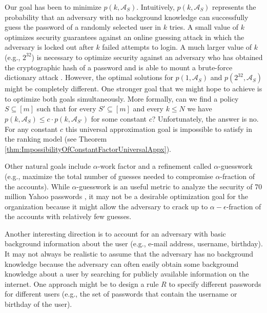 \documentclass[prodmode,acmec]{ec-acmsmall}
\begin{document}
\smallskip
{} Our goal \cite{boztas1999entropies} has been to minimize $p\left(k, \mathcal{A}_S \right)$. Intuitively, $p\left(k, \mathcal{A}_S \right)$ represents the probability that an adversary with no background knowledge can successfully guess the password of a randomly selected user in $k$ tries. A small value of $k$ optimizes security guarantees against an online guessing attack in which the adversary is locked out after $k$ failed attempts to login. A much larger value of $k$ (e.g., $2^{32}$) is necessary to optimize security against an adversary who has obtained the cryptographic hash of a password and is able to mount a brute-force dictionary attack \cite{seeley1989password}. However, the optimal solutions for $p\left(1, \mathcal{A}_S \right)$ and $p\left(2^{32}, \mathcal{A}_S \right)$ might be completely different. One stronger goal that we might hope to achieve is to optimize both goals simultaneously. More formally, can we find a policy $S \subseteq[m]$ such that for every $S' \subseteq[m]$ and every $k \leq N$ we have $p\left(k,\mathcal{A}_S\right) \leq c\cdot p \left(k,\mathcal{A}_{S'}\right)$ for some constant $c$? Unfortunately, the answer is no. For any constant $c$ this universal approximation goal is impossible to satisfy in the ranking model (see Theorem \ref{thm:ImpossibilityOfConstantFactorUniversalAppx}). 
 
 Other natural goals include $\alpha$-work factor \cite{pliam2000incomparability} and a refinement called $\alpha$-guesswork \cite{bonneau2012science} (e.g., maximize the total number of guesses needed to compromise $\alpha$-fraction of the accounts). While $\alpha$-guesswork is an useful metric to analyze the security of 70 million Yahoo passwords \cite{bonneau2012science}, it may not be a desirable optimization goal for the organization because it might allow the adversary to crack up to $\alpha-\epsilon$-fraction of the accounts with relatively few guesses. 
 
Another interesting direction is to account for an adversary with basic background information about the user (e.g., e-mail address, username, birthday). It may not always be realistic to assume that the adversary has no background knowledge because the adversary can often easily obtain some background knowledge about a user by searching for publicly available information on the internet. One approach might be to design a rule $R$ to specify different passwords for different users (e.g., the set of passwords that contain the username or birthday of the user). \\
\end{document}
